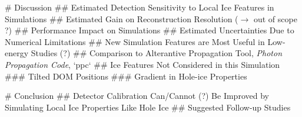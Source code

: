 # Discussion
## Estimated Detection Sensitivity to Local Ice Features in Simulations
## Estimated Gain on Reconstruction Resolution ($\rightarrow$ out of scope ?)
## Performance Impact on Simulations
## Estimated Uncertainties Due to Numerical Limitations
## New Simulation Features are Most Useful in Low-energy Studies (?)
## Comparison to Alterantive Propagation Tool, \textit{Photon Propagation Code}, `ppc`
## Ice Features Not Considered in this Simulation
### Tilted DOM Positions
### Gradient in Hole-ice Properties

# Conclusion
## Detector Calibration Can/Cannot (?) Be Improved by Simulating Local Ice Properties Like Hole Ice
## Suggested Follow-up Studies
